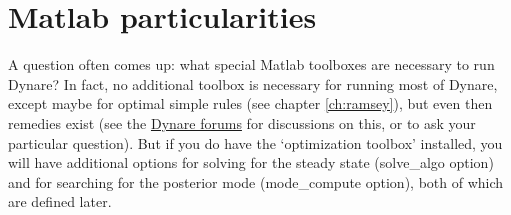 \section{Matlab particularities}

A question often comes up: what special Matlab toolboxes are necessary to run Dynare? In fact, no additional toolbox is necessary for running most of Dynare, except maybe for optimal simple rules (see chapter \ref{ch:ramsey}), but even then remedies exist (see the \href{http://www.cepremap.cnrs.fr/juillard/mambo/index.php?option=com_forum&Itemid=95}{Dynare forums} for discussions on this, or to ask your particular question). But if you do have the `optimization toolbox' installed, you will have additional options for solving for the steady state (solve\_algo option) and for searching for the posterior mode (mode\_compute option), both of which are defined later. 



